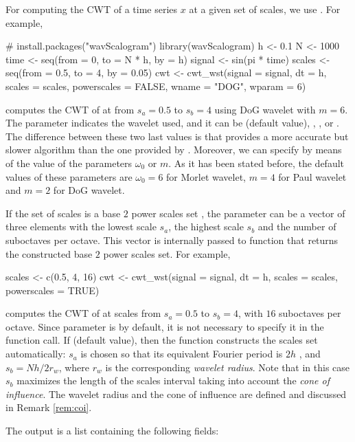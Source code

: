 For computing the CWT of a time series $x$ at a given set of scales, we use . For example,
\begin{example}
# install.packages("wavScalogram")
library(wavScalogram)
h <- 0.1
N <- 1000
time <- seq(from = 0, to = N * h, by = h)
signal <- sin(pi * time)
scales <- seq(from = 0.5, to = 4, by = 0.05)
cwt <- cwt_wst(signal = signal, dt = h,
               scales = scales, powerscales = FALSE,
               wname = "DOG", wparam = 6)
\end{example}
computes the CWT of  at  from $s_a=0.5$ to $s_b=4$ using DoG wavelet with $m=6$. The parameter  indicates the wavelet used, and it can be  (default value), , ,  or . The difference between these two last values is that   provides a more accurate but slower algorithm than the one provided by . Moreover, we can specify by means of  the value of the parameters $\omega_0$ or $m$. As it has been stated before, the default values of these parameters are $\omega_0=6$ for Morlet wavelet, $m=4$ for Paul wavelet and $m=2$ for DoG wavelet.

If the set of scales is a base $2$ power scales set \citep{tor98}, the parameter  can be a vector of three elements with the lowest scale $s_a$, the highest scale $s_b$ and the number of suboctaves per octave. This vector is internally passed to function  that returns the constructed base $2$ power scales set. For example,
\begin{example}
scales <- c(0.5, 4, 16)
cwt <- cwt_wst(signal = signal, dt = h, scales = scales, powerscales = TRUE)
\end{example}
computes the CWT of  at scales from $s_a=0.5$ to $s_b=4$, with $16$ suboctaves per octave. Since parameter  is  by default, it is not necessary to specify it in the function call. If  (default value), then the function constructs the scales set automatically: $s_a$ is chosen so that its equivalent Fourier period is $2h$ \citep{tor98}, and $s_b=Nh/2r_w$, where $r_w$ is the corresponding \emph{wavelet radius}. Note that in this case $s_b$ maximizes the length of the scales interval taking into account the \emph{cone of influence}. The wavelet radius and the cone of influence are defined and discussed in Remark \ref{rem:coi}.

The output  is a list containing the following fields:

